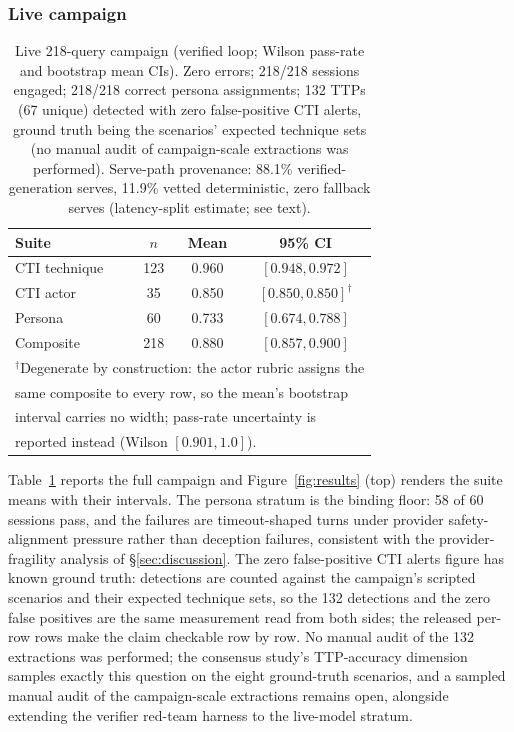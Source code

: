 \subsubsection{Live campaign}
\begin{table}[t]
\centering
\caption{Live 218-query campaign (verified loop; Wilson pass-rate and
bootstrap mean CIs). Zero errors; 218/218 sessions engaged; 218/218
correct persona assignments; 132 TTPs (67 unique) detected with zero
false-positive CTI alerts, ground truth being the scenarios' expected
technique sets (no manual audit of campaign-scale extractions was
performed). Serve-path provenance: 88.1\% verified-generation serves,
11.9\% vetted deterministic, zero fallback serves (latency-split
estimate; see text).}
\label{tab:live}
\begin{tabular}{lccc}
\toprule
Suite & $n$ & Mean & 95\% CI \\
\midrule
CTI technique & 123 & 0.960 & $[0.948, 0.972]$ \\
CTI actor     & 35  & 0.850 & $[0.850, 0.850]^\dagger$ \\
Persona       & 60  & 0.733 & $[0.674, 0.788]$ \\
\midrule
Composite     & 218 & 0.880 & $[0.857, 0.900]$ \\
\bottomrule
\multicolumn{4}{l}{\footnotesize $^\dagger$Degenerate by construction: the actor rubric assigns the} \\
\multicolumn{4}{l}{\footnotesize same composite to every row, so the mean's bootstrap} \\
\multicolumn{4}{l}{\footnotesize interval carries no width; pass-rate uncertainty is} \\
\multicolumn{4}{l}{\footnotesize reported instead (Wilson $[0.901, 1.0]$).} \\
\end{tabular}
\end{table}
Table~\ref{tab:live} reports the full campaign and
Figure~\ref{fig:results} (top) renders the suite means with their
intervals. The persona stratum is
the binding floor: 58 of 60 sessions pass, and the failures are
timeout-shaped turns under provider safety-alignment pressure rather
than deception failures, consistent with the provider-fragility
analysis of \S\ref{sec:discussion}. The zero false-positive CTI alerts
figure has known ground truth: detections are counted against the
campaign's scripted scenarios and their expected technique sets, so the
132 detections and the zero false positives are the same measurement
read from both sides; the released per-row rows make the claim checkable
row by row. No manual audit of the 132 extractions was performed; the
consensus study's TTP-accuracy dimension samples exactly this question
on the eight ground-truth scenarios, and a sampled manual audit of the
campaign-scale extractions remains open, alongside extending the
verifier red-team harness to the live-model stratum.

